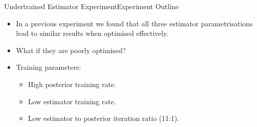 \documentclass[handout]{beamer}
\begin{document}
\begin{frame}{Undertrained Estimator Experiment}{Experiment Outline}
\begin{itemize}
\item In a previous experiment we found that all three estimator parametrisations lead to similar results when optimised effectively.
\vspace{0.5cm}
\item What if they are poorly optimised?
\vspace{0.5cm}
\item Training parameters:
\begin{itemize}
\item High posterior training rate.
\item Low estimator training rate.
\item Low estimator to posterior iteration ratio (11:1).
\end{itemize}
\end{itemize}
\end{frame}
\end{document}
